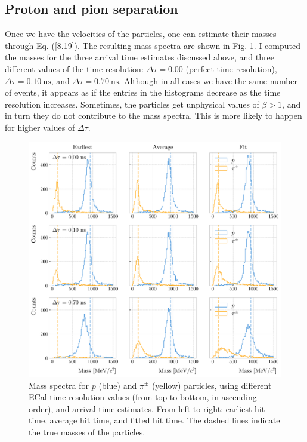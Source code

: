 \subsection{Proton and pion separation}

Once we have the velocities of the particles, one can estimate their masses through Eq. (\ref{8.19}). The resulting mass spectra are shown in Fig. \ref{fig:tof_mass_spectra}. I computed the masses for the three arrival time estimates discussed above, and three different values of the time resolution: $\Delta \tau = 0.00$ (perfect time resolution), $\Delta \tau = 0.10 ~ \mathrm{ns}$, and $\Delta \tau = 0.70 ~ \mathrm{ns}$. Although in all cases we have the same number of events, it appears as if the entries in the histograms decrease as the time resolution increases. Sometimes, the particles get unphysical values of $\beta > 1$, and in turn they do not contribute to the mass spectra. This is more likely to happen for higher values of $\Delta \tau$.

\begin{figure}[t]
	\centering
	\includegraphics[width=.95\linewidth]{Images/GArSoft_PID/tof/reco_mass_comparison.pdf}
	\caption[Mass spectra for $p$ and $\pi^{\pm}$ particles, using different ECal time resolution values and arrival time estimates.]{Mass spectra for $p$ (blue) and $\pi^{\pm}$ (yellow) particles, using different ECal time resolution values (from top to bottom, in ascending order), and arrival time estimates. From left to right: earliest hit time, average hit time, and fitted hit time. The dashed lines indicate the true masses of the particles.}
	\label{fig:tof_mass_spectra}
\end{figure}


